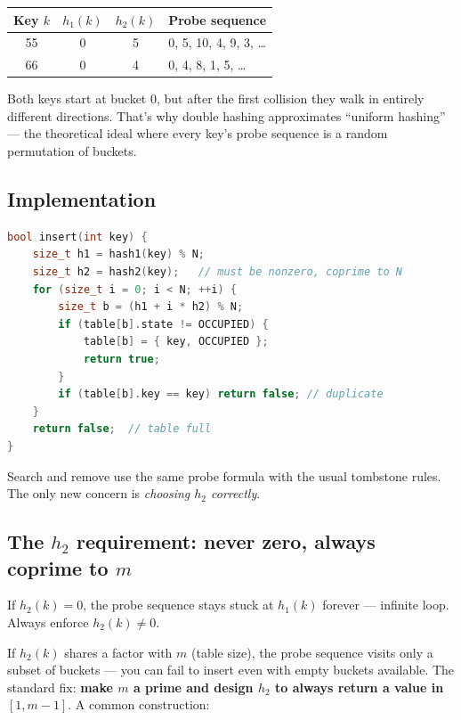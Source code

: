 \documentclass[11pt]{article}
\begin{document}
\begin{center}
\begin{tabular}{|c|c|c|l|}
\hline
\textbf{Key $k$} & $h_1(k)$ & $h_2(k)$ & \textbf{Probe sequence} \\
\hline
55  & 0   & 5 & 0, 5, 10, 4, 9, 3, \ldots \\
66  & 0   & 4 & 0, 4, 8, 1, 5, \ldots \\
\hline
\end{tabular}
\end{center}

Both keys start at bucket 0, but after the first collision they
walk in entirely different directions. That's why double hashing
approximates ``uniform hashing'' --- the theoretical ideal where
every key's probe sequence is a random permutation of buckets.

\subsection*{Implementation}

\begin{examplebox}
\begin{lstlisting}[language=C++,basicstyle=\ttfamily\small,frame=single]
bool insert(int key) {
    size_t h1 = hash1(key) % N;
    size_t h2 = hash2(key);   // must be nonzero, coprime to N
    for (size_t i = 0; i < N; ++i) {
        size_t b = (h1 + i * h2) % N;
        if (table[b].state != OCCUPIED) {
            table[b] = { key, OCCUPIED };
            return true;
        }
        if (table[b].key == key) return false; // duplicate
    }
    return false;  // table full
}
\end{lstlisting}
\end{examplebox}

Search and remove use the same probe formula with the usual
tombstone rules. The only new concern is \emph{choosing $h_2$
correctly}.

\subsection*{The $h_2$ requirement: never zero, always coprime to $m$}

If $h_2(k) = 0$, the probe sequence stays stuck at $h_1(k)$
forever --- infinite loop. Always enforce $h_2(k) \neq 0$.

If $h_2(k)$ shares a factor with $m$ (table size), the probe
sequence visits only a subset of buckets --- you can fail to
insert even with empty buckets available. The standard fix:
\textbf{make $m$ a prime and design $h_2$ to always return a
value in $[1, m-1]$}. A common construction:
\end{document}
